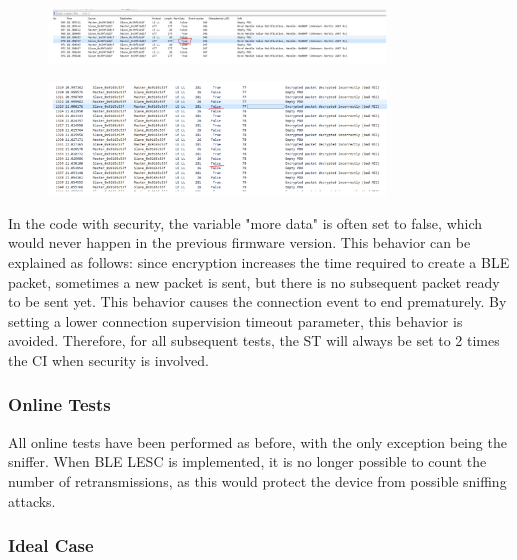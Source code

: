 \documentclass{Configuration_Files/PoliMi3i_thesis}
\begin{document}
\begin{figure}[h!]
    \centering
    \includegraphics[width=0.8\textwidth]{Results Manuel/figure10}
    \label{fig:figure1}
\end{figure}

\begin{figure}[h!]
    \centering
    \includegraphics[width=0.8\textwidth]{Results Manuel/figure11}
    \label{fig:figure1}
\end{figure}

In the code with security, the variable "more data" is often set to false, which would never happen in the previous firmware version. This behavior can be explained as follows: since encryption increases the time required to create a BLE packet, sometimes a new packet is sent, but there is no subsequent packet ready to be sent yet. This behavior causes the connection event to end prematurely. By setting a lower connection supervision timeout parameter, this behavior is avoided. Therefore, for all subsequent tests, the ST will always be set to 2 times the CI when security is involved.

\subsubsection*{Online Tests}

All online tests have been performed as before, with the only exception being the sniffer. When BLE LESC is implemented, it is no longer possible to count the number of retransmissions, as this would protect the device from possible sniffing attacks.

\subsubsection*{Ideal Case}
\end{document}
